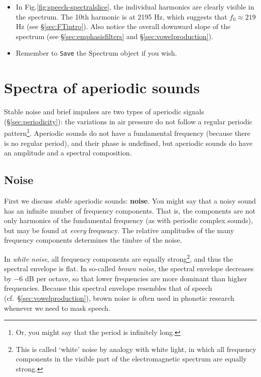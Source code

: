 \documentclass[
]{book}
\begin{document}
\begin{itemize}
\item
  In Fig.\ref{fig:speech-spectralslice}, the individual harmonics are clearly visible in the spectrum. The 10th harmonic is at 2195 Hz, which suggests that \(f_0 \approx 219\) Hz (see §\ref{sec:FTintro}). Also notice the overall downward slope of the spectrum (see §\ref{sec:emphasisfilters} and §\ref{sec:vowelproduction}).
\item
  Remember to \texttt{Save} the Spectrum object if you wish.
\end{itemize}

\section{Spectra of aperiodic sounds}\label{spectra-of-aperiodic-sounds}

Stable noise and brief impulses are two types of aperiodic signals (§\ref{sec:periodicity}): the variations in air pressure do not follow a regular periodic pattern\footnote{Or, you might say that the period is infinitely long.}. Aperiodic sounds do not have a fundamental frequency (because there is no regular period), and their phase is undefined, but aperiodic sounds do have an amplitude and a spectral composition.

\subsection{Noise}\label{sec:noise}

First we discuss \emph{stable} aperiodic sounds: \textbf{noise}. You might say that a noisy sound has an infinite number of frequency components. That is, the components are not only harmonics of the fundamental frequency (as with periodic complex sounds), but may be found at \emph{every} frequency. The relative amplitudes of the many frequency components determines the timbre of the noise.

In \emph{white noise}, all frequency components are equally strong\footnote{This is called `white' noise by analogy with white light, in which all frequency components in the visible part of the electromagnetic spectrum are equally strong.}, and thus the spectral envelope is flat.
In so-called \emph{brown noise}, the spectral envelope decreases by \(-6\) dB per octave, so that lower frequencies are more dominant than higher frequencies. Because this spectral envelope resembles that of speech (cf.~§\ref{sec:vowelproduction}), brown noise is often used in phonetic research whenever we need to mask speech.
\end{document}
